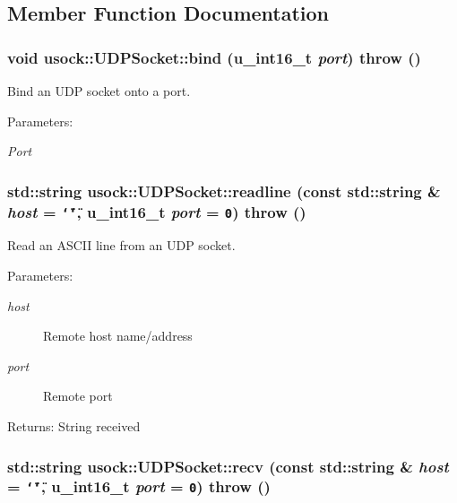 \subsection{Member Function Documentation}
\hypertarget{classusock_1_1UDPSocket_daab178fe0b22f862e8d25d268080f05}{
\subsubsection[{bind}]{\setlength{\rightskip}{0pt plus 5cm}void usock::UDPSocket::bind (u\_\-int16\_\-t {\em port})  throw ()}}
\label{classusock_1_1UDPSocket_daab178fe0b22f862e8d25d268080f05}


Bind an UDP socket onto a port. 

\begin{Desc}
\item[Parameters:]
\begin{description}
\item[{\em Port}]\end{description}
\end{Desc}
\hypertarget{classusock_1_1UDPSocket_aead0f8a12cc8e98a98473bea4d15a0e}{
\subsubsection[{readline}]{\setlength{\rightskip}{0pt plus 5cm}std::string usock::UDPSocket::readline (const std::string \& {\em host} = {\tt \char`\"{}\char`\"{}}, \/  u\_\-int16\_\-t {\em port} = {\tt 0})  throw ()}}
\label{classusock_1_1UDPSocket_aead0f8a12cc8e98a98473bea4d15a0e}


Read an ASCII line from an UDP socket. 

\begin{Desc}
\item[Parameters:]
\begin{description}
\item[{\em host}]Remote host name/address \item[{\em port}]Remote port \end{description}
\end{Desc}
\begin{Desc}
\item[Returns:]String received \end{Desc}
\hypertarget{classusock_1_1UDPSocket_d6dec5293e2768a42b833fb42a720d22}{
\subsubsection[{recv}]{\setlength{\rightskip}{0pt plus 5cm}std::string usock::UDPSocket::recv (const std::string \& {\em host} = {\tt \char`\"{}\char`\"{}}, \/  u\_\-int16\_\-t {\em port} = {\tt 0})  throw ()}}
\label{classusock_1_1UDPSocket_d6dec5293e2768a42b833fb42a720d22}


